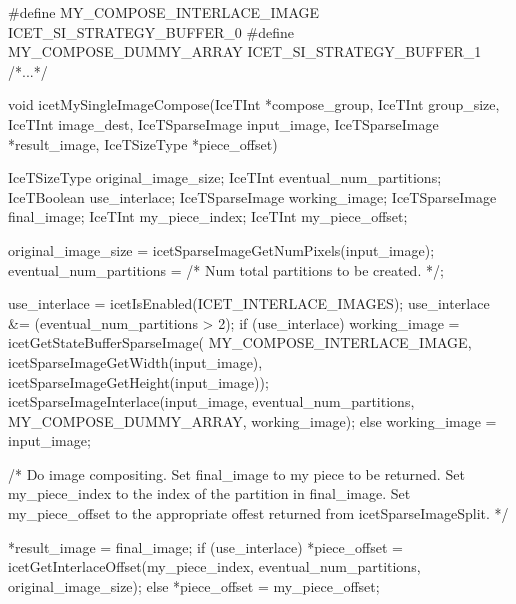 \begin{code}
#define MY_COMPOSE_INTERLACE_IMAGE      ICET_SI_STRATEGY_BUFFER_0
#define MY_COMPOSE_DUMMY_ARRAY          ICET_SI_STRATEGY_BUFFER_1
/*...*/

void icetMySingleImageCompose(IceTInt *compose_group,
                              IceTInt group_size,
                              IceTInt image_dest,
                              IceTSparseImage input_image,
                              IceTSparseImage *result_image,
                              IceTSizeType *piece_offset)
{
    IceTSizeType original_image_size;
    IceTInt eventual_num_partitions;
    IceTBoolean use_interlace;
    IceTSparseImage working_image;
    IceTSparseImage final_image;
    IceTInt my_piece_index;
    IceTInt my_piece_offset;

    original_image_size = icetSparseImageGetNumPixels(input_image);
    eventual_num_partitions = /* Num total partitions to be created. */;

    use_interlace  = icetIsEnabled(ICET_INTERLACE_IMAGES);
    use_interlace &= (eventual_num_partitions > 2);
    if (use_interlace) {
        working_image = icetGetStateBufferSparseImage(
                                         MY_COMPOSE_INTERLACE_IMAGE,
                                         icetSparseImageGetWidth(input_image),
                                         icetSparseImageGetHeight(input_image));
        icetSparseImageInterlace(input_image,
                                 eventual_num_partitions,
                                 MY_COMPOSE_DUMMY_ARRAY,
                                 working_image);
    } else {
        working_image = input_image;
    }

    /* Do image compositing.  Set final_image to my piece to be returned.
       Set my_piece_index to the index of the partition in final_image.
       Set my_piece_offset to the appropriate offest returned from
       icetSparseImageSplit. */

    *result_image = final_image;
    if (use_interlace) {
        *piece_offset = icetGetInterlaceOffset(my_piece_index,
                                               eventual_num_partitions,
                                               original_image_size);
    } else {
        *piece_offset = my_piece_offset;
    }
}
\end{code}

